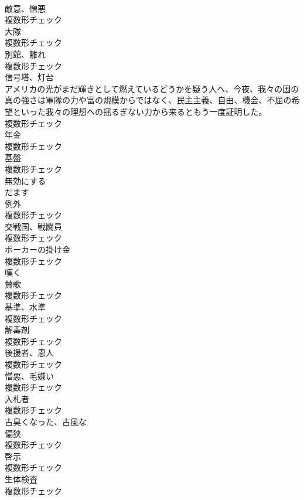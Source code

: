 \documentclass[8pt]{extreport}
\begin{document}
\begin{CJK}{UTF8}{min}
\\	[名詞]	敵意、憎悪	
\\	複数形チェック
\\	[名詞]	大隊	
\\	複数形チェック
\\	[名詞]	別館、離れ	
\\	複数形チェック
\\	[名詞]	信号塔、灯台	
\\	アメリカの光がまだ輝きとして燃えているどうかを疑う人へ、今夜、我々の国の真の強さは軍隊の力や富の規模からではなく、民主主義、自由、機会、不屈の希望といった我々の理想への揺るぎない力から来るともう一度証明した。	
\\	複数形チェック
\\	[名詞]	年金	
\\	複数形チェック
\\	[名詞]	基盤	
\\	複数形チェック
\\	[動詞]	無効にする	
\\	[動詞]	だます	
\\	[名詞]	例外	
\\	複数形チェック
\\	[名詞]	交戦国、戦闘員	
\\	複数形チェック
\\	[名詞]	ポーカーの掛け金	
\\	複数形チェック
\\	[動詞]	嘆く	
\\	[名詞]	賛歌	
\\	複数形チェック
\\	[名詞]	基準、水準	
\\	複数形チェック
\\	[名詞]	解毒剤	
\\	複数形チェック
\\	[名詞]	後援者、恩人	
\\	複数形チェック
\\	[名詞]	憎悪、毛嫌い	
\\	複数形チェック
\\	[名詞]	入札者	
\\	複数形チェック
\\	[形容詞]	古臭くなった、古風な	
\\	[名詞]	偏狭	
\\	複数形チェック
\\	[名詞]	啓示	
\\	複数形チェック
\\	[名詞]	生体検査	
\\	複数形チェック

\end{CJK}
\end{document}
